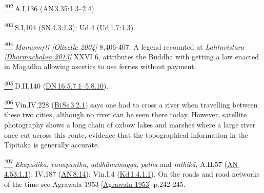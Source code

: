 \label{footprints_split_024.html_fn402}
\hyperref[footprints_split_011.htmlux5cux23fnref402]{\textsuperscript{402}} A.I,136
(\href{https://suttacentral.net/an3.35/en/sujato\#1.3}{AN\,3.35:1.3--2.4}).

\label{footprints_split_024.html_fn403}
\hyperref[footprints_split_011.htmlux5cux23fnref403]{\textsuperscript{403}} S.I,104
(\href{https://suttacentral.net/sn4.3/en/sujato\#1.3}{SN\,4.3:1.3});
Ud.4
(\href{https://suttacentral.net/ud1.7/en/sujato\#1.3}{Ud\,1.7:1.3}).

\label{footprints_split_024.html_fn404}
\hyperref[footprints_split_012.htmlux5cux23fnref404]{\textsuperscript{404}} \emph{{Manusmṛti
{{[}\hyperref[footprints_split_022.htmlux5cux23Olivelleux5cux25202004]{Olivelle
2004}{]}}}} 8,406-407. A legend recounted at \emph{{Lalitavistara
{{[}\hyperref[footprints_split_023.htmlux5cux23Dharmachakraux5cux25202013]{Dharmachakra
2013}{]}}}} XXVI 6, attributes the Buddha with getting a law enacted in
Magadha allowing ascetics to use ferries without payment.

\label{footprints_split_024.html_fn405}
\hyperref[footprints_split_012.htmlux5cux23fnref405]{\textsuperscript{405}} D.II,140
(\href{https://suttacentral.net/dn16/en/sujato\#5.7.1}{DN\,16:5.7.1--5.8.10}).

\label{footprints_split_024.html_fn406}
\hyperref[footprints_split_012.htmlux5cux23fnref406]{\textsuperscript{406}} Vin.IV,228
(\href{https://suttacentral.net/pli-tv-bi-vb-ss3/en/brahmali?\#2.1}{Bi\,Ss\,3:2.1})
says one had to cross a river when travelling between these two cities,
although no river can be seen there today. However, satellite
photography shows a long chain of oxbow lakes and marshes where a large
river once cut across this route, evidence that the topographical
information in the Tipitaka is generally accurate.

\label{footprints_split_024.html_fn407}
\hyperref[footprints_split_012.htmlux5cux23fnref407]{\textsuperscript{407}} \emph{Ekapadika},
\emph{vanapantha}, \emph{addhānamagga}, \emph{patha} and \emph{rathikā},
A.II,57
(\href{https://suttacentral.net/an4.53/en/sujato\#1.1}{AN\,4.53:1.1});
IV,187 (\href{https://suttacentral.net/an8.14/en/sujato}{AN\,8.14});
Vin.I,4
(\href{https://suttacentral.net/pli-tv-kd1/en/brahmali?\#4.1.1}{Kd\,1:4.1.1}).
On the roads and road networks of the time see {Agrawala 1953
{{[}\hyperref[footprints_split_022.htmlux5cux23Agrawalaux5cux25201953]{Agrawala
1953}{]}}} p.242-245.

